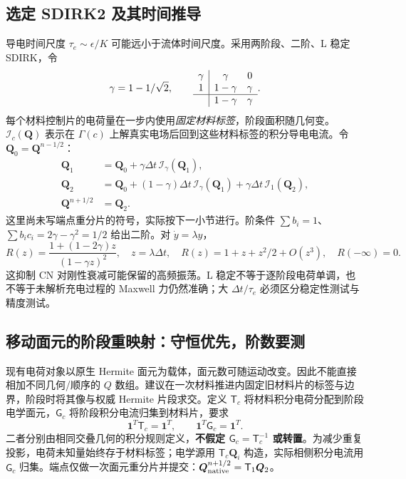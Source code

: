 \documentclass[UTF8,a4paper,11pt,fontset=fandol]{ctexart}
\numberwithin{equation}{section}
\newcommand{\dt}{\Delta t}\newcommand{\dd}{\,\mathrm d}
\newcommand{\QQ}{\bm Q}\newcommand{\pp}{\bm p}\newcommand{\EE}{\bm E}
\newcommand{\mat}[1]{\mathsf{#1}}\newcommand{\code}[1]{\nolinkurl{#1}}
\begin{document}
\subsection{选定 SDIRK2 及其时间推导}
导电时间尺度 $\tau_e\sim\epsilon/K$ 可能远小于流体时间尺度。采用两阶段、二阶、L 稳定 SDIRK\cite{alexander}，令
\begin{equation}
 \gamma=1-1/\sqrt2,\qquad
 \begin{array}{c|cc}\gamma&\gamma&0\\1&1-\gamma&\gamma\\\hline&1-\gamma&\gamma\end{array}.
\end{equation}
每个材料控制片的电荷量在一步内使用\emph{固定材料标签}，阶段面积随几何变。$\mathcal I_c(\QQ)$ 表示在 $\Gamma(c)$ 上解真实电场后回到这些材料标签的积分导电电流。令 $\QQ_0=\QQ^{n-1/2}$：
\begin{subequations}\label{eq:sdirk}
\begin{align}
 \QQ_1&=\QQ_0+\gamma\dt\,\mathcal I_\gamma(\QQ_1),\\
 \QQ_2&=\QQ_0+(1-\gamma)\dt\,\mathcal I_\gamma(\QQ_1)
                   +\gamma\dt\,\mathcal I_1(\QQ_2),\\
 \QQ^{n+1/2}&=\QQ_2.
\end{align}
\end{subequations}
这里尚未写端点重分片的符号，实际按下一小节进行。阶条件 $\sum b_i=1$、$\sum b_ic_i=2\gamma-\gamma^2=1/2$ 给出二阶。对 $\dot y=\lambda y$，
\begin{equation}
 R(z)=\frac{1+(1-2\gamma)z}{(1-\gamma z)^2},\quad z=\lambda\dt,
 \quad R(z)=1+z+z^2/2+O(z^3),\quad R(-\infty)=0.
\end{equation}
这抑制 CN 对刚性衰减可能保留的高频振荡。L 稳定不等于逐阶段电荷单调，也不等于未解析充电过程的 Maxwell 力仍然准确；大 $\dt/\tau_e$ 必须区分稳定性测试与精度测试。

\subsection{移动面元的阶段重映射：守恒优先，阶数要测}
现有电荷对象以原生 Hermite 面元为载体，面元数可随运动改变。因此不能直接相加不同几何/顺序的 $Q$ 数组。建议在一次材料推进内固定旧材料片的标签与边界，阶段时将其像与权威 Hermite 片段求交。定义 $\mat T_c$ 将材料积分电荷分配到阶段电学面元，$\mat G_c$ 将阶段积分电流归集到材料片，要求
\begin{equation}
 \bm1^T\mat T_c=\bm1^T,\qquad \bm1^T\mat G_c=\bm1^T.
\end{equation}
二者分别由相同交叠几何的积分规则定义，\textbf{不假定 $\mat G_c=\mat T_c^{-1}$ 或转置}。为减少重复投影，电荷未知量始终存于材料标签；电学源用 $\mat T_c\QQ_i$ 构造，实际相侧积分电流用 $\mat G_c$ 归集。端点仅做一次面元重分片并提交：$\QQ_{\rm native}^{n+1/2}=\mat T_1\QQ_2$。
\end{document}
